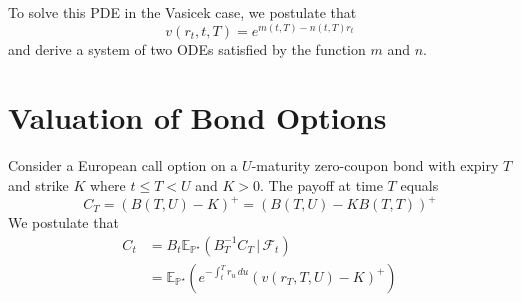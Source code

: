 \documentclass[10pt, oneside, reqno]{amsbook}
\theoremstyle{plain}%
\newtheorem{lem}[thm]{Lemma}
\theoremstyle{definition}
\theoremstyle{rem}
\theoremstyle{definition}
\def \P {\ensuremath{\mathcal{P}}}
\newcommand{\var}{\text{Var}}
\newcommand{\given}{ \, | \,}
\newcommand{\sigf}{\mathcal{F}}
\newcommand{\E}{\mathbb{E}}
\renewcommand{\P}{\mathbb{P}}
\numberwithin{equation}{chapter}
\begin{document}
To solve this PDE in the Vasicek case, we postulate that \[
    v(r_t, t, T) = e^{m(t, T) - n(t, T) r_t}
\] and derive a system of two ODEs satisfied by the function $m$ and $n$. 



\section{Valuation of Bond Options} %
\label{sub:valuation_of_bond_optiosn}

Consider a European call option on a $U$-maturity zero-coupon bond with expiry $T$ and strike $K$ where $t \leq T < U$ and $K > 0$.  The payoff at time $T$ equals \[
    C_T = \left(B(T, U) - K \right)^+ = \left(B(T, U) - KB(T, T) \right)^+
\]  We postulate that \begin{align*}
    C_t     &= B_t \E_{\P^\star} \left(B_T^{-1} C_T \given \sigf_t \right) \\
            &= \E_{\P^\star} \left( e^{-\int_t^T r_u \, du} \left(v\left(r_T, T, U \right) - K\right)^+ \right) 
\end{align*}
\end{document}
